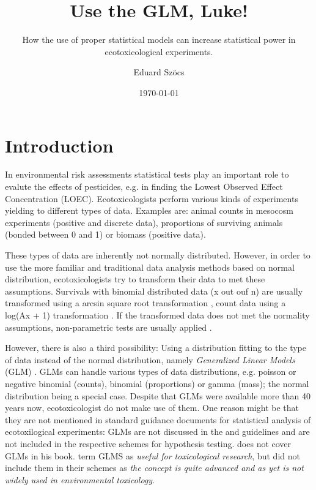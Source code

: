 \documentclass{scrartcl}\usepackage[]{graphicx}\usepackage[]{color}
\title{Use the GLM, Luke!}
\subtitle{How the use of proper statistical models can increase statistical power in ecotoxicological experiments.}
\author{Eduard Szöcs}
\date{\today}
\begin{document}
\maketitle

\section{Introduction}

In environmental risk assessments statistical tests play an important role to evalute the effects of pesticides, e.g. in finding the Lowest Observed Effect Concentration (LOEC).
Ecotoxicologists perform various kinds of experiments yielding to different types of data.
Examples are: animal counts in mesocosm experiments (positive and discrete data), 
proportions of surviving animals (bonded between 0 and 1) or biomass (positive data).

These types of data are inherently not normally distributed. 
However, in order to use the more familiar and traditional data analysis methods based on normal distribution, ecotoxicologists try to transform their data to met these assumptions. 
Survivals with binomial distributed data (x out ouf n) are usually transformed using a arcsin square root transformation \citep{oecd_current_2006,
newman_quantitative_2012},
count data using a log(Ax + 1) transformation \citep{van_den_brink_impact_2000}.
If the transformed data does not met the normality assumptions, non-parametric tests are usually applied \citep{wang_making_2011}.

However, there is also a third possibility:
Using a distribution fitting to the type of data instead of the normal distribution, namely \emph{Generalized Linear Models} (GLM) \citep{nelder_generalized_1972}. 
GLMs can handle various types of data distributions, e.g. poisson or negative binomial (counts), binomial (proportions) or gamma (mass); the normal distribution being a special case.
Despite that GLMs were available more than 40 years now, ecotoxicologist do not make use of them.
One reason might be that they are not mentioned in standard guidance documents for statistical analysis of ecotoxilogical experiments:
GLMs are not discussed in the \citep{oecd_current_2006} and \citep{epa_methods_2002} guidelines and are not included in the respective schemes for hypothesis testing. 
\citet{newman_quantitative_2012} does not cover GLMs in his book.
\citet{environment_canada_guidance_2005} term GLMS as \emph{useful for toxicological research}, but did not include them in their schemes as \emph{the concept is quite advanced and as yet is not widely used in environmental toxicology}.
\end{document}
